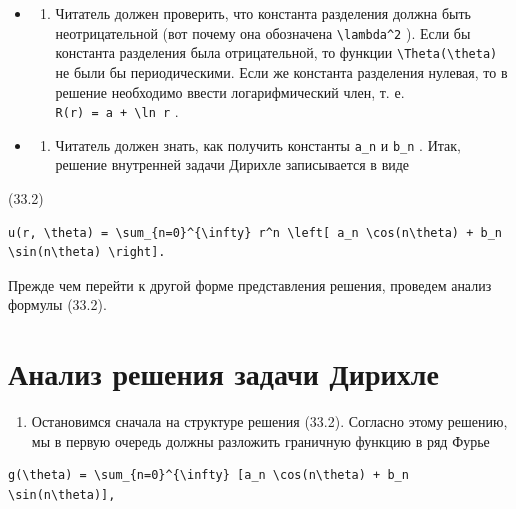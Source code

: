 \documentclass[
  ukrainian,
]{article}
\providecommand{\tightlist}{%
  \setlength{\itemsep}{0pt}\setlength{\parskip}{0pt}}
\begin{document}
\begin{itemize}
\tightlist
\item
  \begin{enumerate}
  \def\labelenumi{\arabic{enumi}.}
  \tightlist
  \item
    Читатель должен проверить, что константа разделения должна быть
    неотрицательной (вот почему она обозначена
    \texttt{\textbackslash{}lambda\^{}2} ). Если бы константа разделения
    была отрицательной, то функции
    \texttt{\textbackslash{}Theta(\textbackslash{}theta)} не были бы
    периодическими. Если же константа разделения нулевая, то в решение
    необходимо ввести логарифмический член, т. е.
    \texttt{R(r)\ =\ a\ +\ \textbackslash{}ln\ r} .
  \end{enumerate}
\item
  \begin{enumerate}
  \def\labelenumi{\arabic{enumi}.}
  \setcounter{enumi}{1}
  \tightlist
  \item
    Читатель должен знать, как получить константы \texttt{a\_n} и
    \texttt{b\_n} . Итак, решение внутренней задачи Дирихле записывается
    в виде
  \end{enumerate}
\end{itemize}

(33.2)

\begin{verbatim}
u(r, \theta) = \sum_{n=0}^{\infty} r^n \left[ a_n \cos(n\theta) + b_n \sin(n\theta) \right].
\end{verbatim}

Прежде чем перейти к другой форме представления решения, проведем анализ
формулы (33.2).

\section{Анализ решения задачи
Дирихле}\label{ux430ux43dux430ux43bux438ux437-ux440ux435ux448ux435ux43dux438ux44f-ux437ux430ux434ux430ux447ux438-ux434ux438ux440ux438ux445ux43bux435}

\begin{enumerate}
\def\labelenumi{\arabic{enumi}.}
\tightlist
\item
  Остановимся сначала на структуре решения (33.2). Согласно этому
  решению, мы в первую очередь должны разложить граничную функцию в ряд
  Фурье
\end{enumerate}

\begin{verbatim}
g(\theta) = \sum_{n=0}^{\infty} [a_n \cos(n\theta) + b_n \sin(n\theta)],
\end{verbatim}
\end{document}
